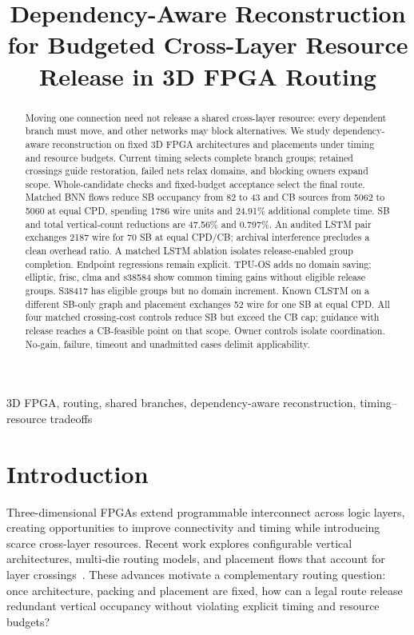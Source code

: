 \documentclass[conference,10pt]{IEEEtran}
\title{Dependency-Aware Reconstruction for Budgeted Cross-Layer Resource Release in 3D FPGA Routing}
\author{\IEEEauthorblockN{Anonymous submission}}
\begin{document}
\maketitle
\begin{abstract}
Moving one connection need not release a shared cross-layer resource: every dependent branch must move, and other networks may block alternatives. We study dependency-aware reconstruction on fixed 3D FPGA architectures and placements under timing and resource budgets. Current timing selects complete branch groups; retained crossings guide restoration, failed nets relax domains, and blocking owners expand scope. Whole-candidate checks and fixed-budget acceptance select the final route. Matched BNN flows reduce SB occupancy from 82 to 43 and CB sources from 5062 to 5060 at equal CPD, spending 1786 wire units and 24.91\% additional complete time. SB and total vertical-count reductions are 47.56\% and 0.797\%. An audited LSTM pair exchanges 2187 wire for 70 SB at equal CPD/CB; archival interference precludes a clean overhead ratio. A matched LSTM ablation isolates release-enabled group completion. Endpoint regressions remain explicit. TPU-OS adds no domain saving; elliptic, frisc, clma and s38584 show common timing gains without eligible release groups. S38417 has eligible groups but no domain increment. Known CLSTM on a different SB-only graph and placement exchanges 52 wire for one SB at equal CPD. All four matched crossing-cost controls reduce SB but exceed the CB cap; guidance with release reaches a CB-feasible point on that scope. Owner controls isolate coordination. No-gain, failure, timeout and unadmitted cases delimit applicability.
\end{abstract}
\begin{IEEEkeywords}
3D FPGA, routing, shared branches, dependency-aware reconstruction, timing--resource tradeoffs
\end{IEEEkeywords}

\section{Introduction}
Three-dimensional FPGAs extend programmable interconnect across logic layers, creating opportunities to improve connectivity and timing while introducing scarce cross-layer resources. Recent work explores configurable vertical architectures, multi-die routing models, and placement flows that account for layer crossings~\cite{lazagna,multidie,flatland}. These advances motivate a complementary routing question: once architecture, packing and placement are fixed, how can a legal route release redundant vertical occupancy without violating explicit timing and resource budgets?
\end{document}
